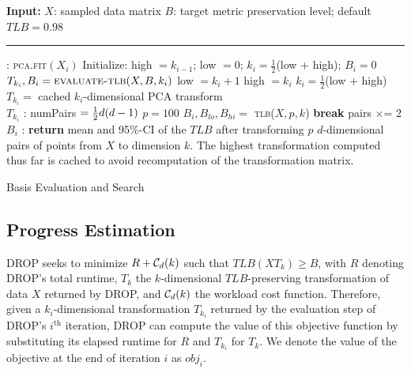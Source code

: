 \begin{algorithm}
\begin{algorithmic}[1]
\small
\Statex \textbf{Input:}  
\Statex $X$: sampled data matrix
\Statex $B$: target metric preservation level; default $TLB = 0.98$
\Statex  \hrule 
{}: \label{eq:basis}
	\State \textsc{pca.fit}$(X_i)$
	\State Initialize: high $= k_{i-1}$; low $=0$; $k_i= \frac{1}{2}$(low + high); $B_i = 0$
		\State $T_{k_i}, B_i  = \textsc{evaluate-tlb}( X, B, k_i)$
		  low $= k_i + 1$ 
		\Else  \hspace{0pt} high $= k_i $
		\EndIf
		\State $k_i = \frac{1}{2}$(low + high)
	\EndWhile
	\State $T_{k_i} = $ cached $k_i$-dimensional PCA transform\\
	\Return $T_{k_i}$
\EndFunction
\Statex 
{}: \label{eq:eval}
	\State numPairs $= \frac{1}{2}{\color{black}d}({\color{black}d}-1)$
	\State $p = 100$
		\State $B_i, B_{lo}, B_{hi} = $ \textsc{tlb}($ X, p, k$)
			 \label{eq:paircheck}
		   \textbf{break}
		\Else \hspace{0pt} pairs $\times$= $ 2$
		\EndIf
	\EndWhile
	\\\Return $B_i$	
\EndFunction
\Statex 
{}: \label{eq:tlbeval}
	\State \textbf{return } mean and 95\%-CI of the $TLB$ after transforming $p$ $d$-dimensional pairs of points from $X$ to dimension $k$. The highest transformation computed thus far is cached to avoid recomputation of the transformation matrix.
\EndFunction

\end{algorithmic}
\caption{Basis Evaluation and Search}
\label{alg:candidate}
\end{algorithm}


\subsection{Progress Estimation}
\label{subsec:pest}

DROP seeks to minimize $R + \mathcal{C}_{\color{black}d}(k)$ such that $TLB(XT_k) \geq B$, with $R$ denoting DROP's total runtime, $T_k$ the $k$-dimensional $TLB$-preserving transformation of data $X$ returned by DROP, and $\mathcal{C}_{\color{black}d}(k)$ the workload cost function. 
Therefore, given a $k_i$-dimensional transformation $T_{k_i}$ returned by the evaluation step of DROP's $i^{\text{th}}$ iteration, DROP can compute the value of this objective function by substituting its elapsed runtime for $R$ and $T_{k_i}$ for $T_k$.  
We denote the value of the objective at the end of iteration $i$ as $obj_i$. 

